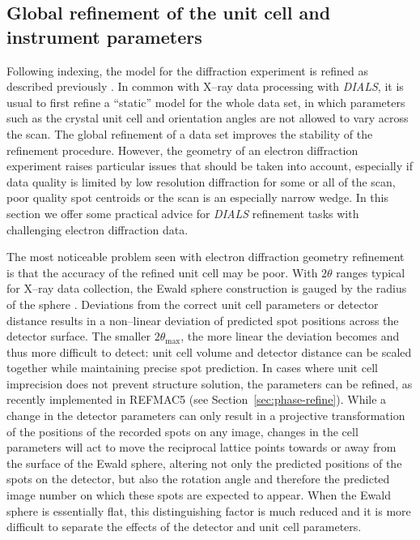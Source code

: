 \documentclass[preprint]{iucr}
\newcommand{\dials}{\emph{DIALS}\xspace}
\newcounter{DWCounter}
\newcommand{\DW}[1]{%
   \stepcounter{DWCounter}%
   {\color{red}{\textbf{DW \#\arabic{DWCounter}: }#1}}%
  }
\begin{document}
\subsection{Global refinement of the unit cell and instrument parameters
\label{sec:refinement}}

Following indexing, the model for the diffraction experiment is refined as
described previously \cite{Waterman2016}. In common with X--ray data processing
with \dials, it is usual to first refine a ``static'' model for the whole data
set, in which parameters such as the crystal unit cell and orientation angles
are not allowed to vary across the scan. The global refinement of a data set
improves the stability of the refinement procedure. However, the geometry of an
electron diffraction experiment raises particular issues that should be taken
into account, especially if data quality is limited by low resolution
diffraction for some or all of the scan, poor quality spot centroids or the
scan is an especially narrow wedge. In this section we offer some practical
advice for \dials refinement tasks with challenging electron diffraction data.

The most noticeable problem seen with electron diffraction geometry refinement
is that the accuracy of the refined unit cell may be poor. With $2\theta$
ranges typical for X--ray data collection, the Ewald sphere construction is
gauged by the radius of the sphere \DW{What does that sentence mean?}.
Deviations from the correct unit cell parameters or detector distance results
in a non--linear deviation of predicted spot positions across the detector
surface. The smaller $2\theta_\text{max}$, the more linear the deviation
becomes and thus more difficult to detect: unit cell volume and detector
distance can be scaled together while maintaining precise spot prediction. In
cases where unit cell imprecision does not prevent structure solution, the
parameters can be refined, as recently implemented in REFMAC5 (see
Section~\ref{sec:phase-refine}).  While a change in the detector parameters can
only result in a projective transformation of the positions of the recorded
spots on any image, changes in the cell parameters will act to move the
reciprocal lattice points towards or away from the surface of the Ewald sphere,
altering not only the predicted positions of the spots on the detector, but
also the rotation angle and therefore the predicted image number on which these
spots are expected to appear. When the Ewald sphere is essentially flat, this
distinguishing factor is much reduced and it is more difficult to separate the
effects of the detector and unit cell parameters.
\end{document}
